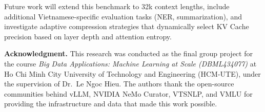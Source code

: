 \documentclass[10pt,twocolumn]{article}
\begin{document}
Future work will extend this benchmark to 32k context lengths,
include additional Vietnamese-specific evaluation tasks (NER, summarization),
and investigate adaptive compression strategies that dynamically
select KV Cache precision based on layer depth and attention entropy.

\medskip
\noindent\textbf{Acknowledgment.}
This research was conducted as the final group project for the course
\emph{Big Data Applications: Machine Learning at Scale (DBML434077)}
at Ho Chi Minh City University of Technology and Engineering (HCM-UTE),
under the supervision of Dr.~Le Ngoc Hieu.
The authors thank the open-source communities behind vLLM, NVIDIA NeMo Curator,
VTSNLP, and VMLU for providing the infrastructure and data that made
this work possible.





\end{document}
